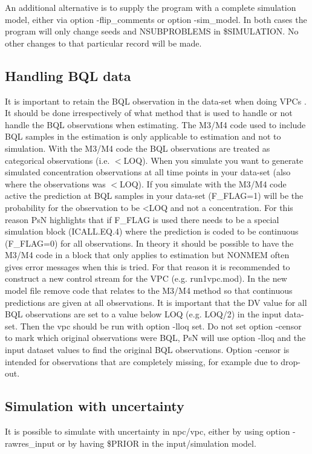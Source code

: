 An additional alternative is to supply the program with a complete simulation model, either via option -flip\_comments or option -sim\_model. In both cases the program will only change seeds and NSUBPROBLEMS in \$SIMULATION. No other changes to that particular record will be made.

\subsection{Handling BQL data}
It is important to retain the BQL observation in the data-set when doing VPCs \cite{BQL}. It should be done irrespectively of what method that is used to handle or not handle the BQL observations when estimating. The M3/M4 code used to include BQL samples in the estimation is only applicable to estimation and not to simulation. With the M3/M4 code the BQL observations are treated as categorical observations (i.e. $<$LOQ). When you simulate you want to generate simulated concentration observations at all time points in your data-set (also where the observations was $<$LOQ). If you simulate with the M3/M4 code active the prediction at BQL samples in your data-set (F\_FLAG=1) will be the probability for the observation to be <LOQ and not a concentration. For this reason PsN highlights that if F\_FLAG is used there needs to be a special simulation block (ICALL.EQ.4) where the prediction is coded to be continuous (F\_FLAG=0) for all observations. In theory it should be possible to have the M3/M4 code in a block that only applies to estimation but NONMEM often gives error messages when this is tried. For that reason it is recommended to construct a new control stream for the VPC (e.g. run1vpc.mod). In the new model file remove code that relates to the M3/M4 method so that continuous predictions are given at all observations. It is important that the DV value for all BQL observations are set to a value below LOQ (e.g. LOQ/2) in the input data-set. Then the vpc should be run with option -lloq set. Do not set option -censor to mark which original observations were BQL, PsN will use option -lloq and the input dataset values to find the original BQL observations. Option -censor is intended for observations that are completely missing, for example due to drop-out.

\subsection{Simulation with uncertainty}
It is possible to simulate with uncertainty in npc/vpc, either by using option -rawres\_input or by having \$PRIOR in the input/simulation model.

